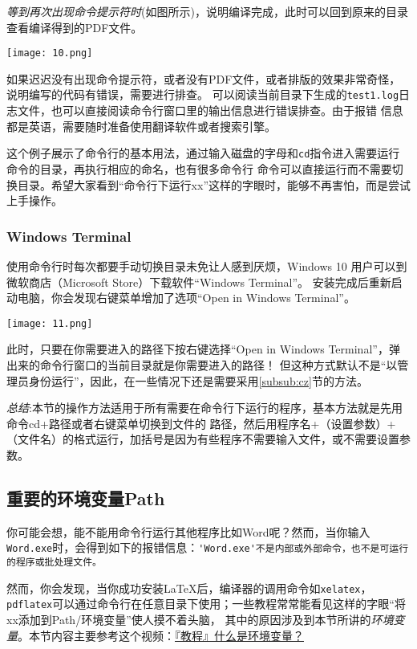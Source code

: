 \emph{等到再次出现命令提示符时}(如图所示)，说明编译完成，此时可以回到原来的目录查看编译得到的PDF文件。
\begin{center}
  \texttt{[image: 10.png]}
\end{center}

如果迟迟没有出现命令提示符，或者没有PDF文件，或者排版的效果非常奇怪，说明编写的代码有错误，需要进行排查。
可以阅读当前目录下生成的\verb"test1.log"日志文件，也可以直接阅读命令行窗口里的输出信息进行错误排查。由于报错
信息都是英语，需要随时准备使用翻译软件或者搜索引擎。

这个例子展示了命令行的基本用法，通过输入磁盘的字母和\verb"cd"指令进入需要运行命令的目录，再执行相应的命名，也有很多命令行
命令可以直接运行而不需要切换目录。希望大家看到“命令行下运行xx”这样的字眼时，能够不再害怕，而是尝试上手操作。



\subsubsection{Windows Terminal}


使用命令行时每次都要手动切换目录未免让人感到厌烦，Windows 10 用户可以到微软商店（Microsoft Store）下载软件“Windows Terminal”。
安装完成后重新启动电脑，你会发现右键菜单增加了选项“Open in Windows Terminal”。

\begin{center}
  \texttt{[image: 11.png]}
\end{center}
此时，只要在你需要进入的路径下按右键选择“Open in Windows Terminal”，弹出来的命令行窗口的当前目录就是你需要进入的路径！
但这种方式默认不是“以管理员身份运行”，因此，在一些情况下还是需要采用\ref{subsub:cz}节的方法。

\emph{总结}:本节的操作方法适用于所有需要在命令行下运行的程序，基本方法就是先用命令cd+路径或者右键菜单切换到文件的
路径，然后用程序名+（设置参数）+（文件名）的格式运行，加括号是因为有些程序不需要输入文件，或不需要设置参数。

\subsection{重要的环境变量Path}


你可能会想，能不能用命令行运行其他程序比如Word呢？然而，当你输入\verb"Word.exe"时，会得到如下的报错信息：\verb"'Word.exe'不是内部或外部命令，也不是可运行的程序或批处理文件。"

然而，你会发现，当你成功安装\LaTeX{}后，编译器的调用命令如\verb"xelatex"，\verb"pdflatex"可以通过命令行在任意目录下使用；一些教程常常能看见这样的字眼“将xx添加到Path/环境变量”使人摸不着头脑，
其中的原因涉及到本节所讲的\emph{环境变量}。本节内容主要参考这个视频：\href{https://www.bilibili.com/video/BV1w741147G9?from=search&seid=9151606959931684460&spm_id_from=333.337.0.0}{『教程』什么是环境变量？}



